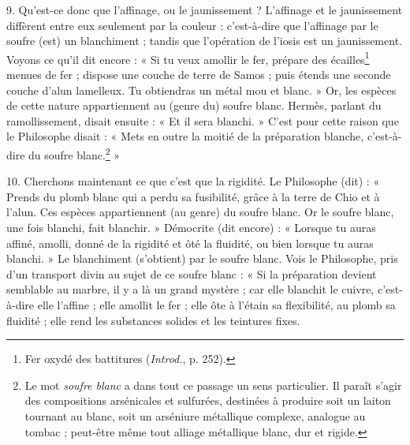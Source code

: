 \documentclass[landscape, a4paper, 11pt, oneside, polutonikogreek, french]{article}
\begin{document}
9. Qu'est-ce donc que l'affinage, ou le jaunissement ? L'affinage et le jaunissement diffèrent entre eux seulement par la couleur : c'est-à-dire que l'affinage par le soufre (est) un blanchiment ; tandis que l'opération de l'iosis est un jaunissement. Voyons ce qu'il dit encore : « Si tu veux amollir le fer, prépare des écailles\footnote{Fer oxydé des battitures (\emph{Introd.}, p. 252).} menues de fer ; dispose une couche de terre de Samos ; puis étends une seconde couche d'alun lamelleux. Tu obtiendras un métal mou et blanc. » Or, les espèces de cette nature appartiennent au (genre du) soufre blanc. Hermès, parlant du ramollissement, disait ensuite : « Et il sera blanchi. » C'est pour cette raison que le Philosophe disait : « Mets en outre la moitié de la préparation blanche, c'est-à-dire du soufre blanc.\footnote{Le mot \emph{soufre blanc} a dans tout ce passage un sens particulier. Il paraît s'agir des compositions arsénicales et sulfurées, destinées à produire soit un laiton tournant au blanc, soit un arséniure métallique complexe, analogue au tombac ; peut-être même tout alliage métallique blanc, dur et rigide.} »

10. Cherchons maintenant ce que c'est que la rigidité. Le Philosophe (dit) : « Prends du plomb blanc qui a perdu sa fusibilité, grâce à la terre de Chio et à l'alun. Ces espèces appartiennent (au genre) du soufre blanc. Or le soufre blanc, une fois blanchi, fait blanchir. » Démocrite (dit encore) : « Lorsque tu auras affiné, amolli, donné de la rigidité et ôté la fluidité, ou bien lorsque tu auras blanchi. » Le blanchiment (s'obtient) par le soufre blanc. Vois le Philosophe, pris d'un transport divin au sujet de ce soufre blanc : « Si la préparation devient semblable au marbre, il y a là un grand mystère ; car elle blanchit le cuivre, c'est-à-dire elle l'affine ; elle amollit le fer ; elle ôte à l'étain sa flexibilité, au plomb sa fluidité ; elle rend les substances solides et les teintures fixes.
\end{document}
